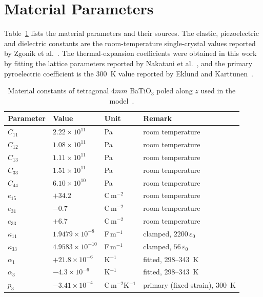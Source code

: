 \documentclass[a4paper,12pt]{elsarticle}
\begin{document}
\section{Material Parameters}
\label{sec:materials}

Table~\ref{tab:materials} lists the material parameters and their sources. The elastic,
piezoelectric and dielectric constants are the room-temperature single-crystal values
reported by Zgonik et al.~\cite{Zgonik1994}. The thermal-expansion coefficients were
obtained in this work by fitting the lattice parameters reported by Nakatani et al.~\cite{Nakatani2016}, and the primary pyroelectric coefficient is the 300~K value
reported by Eklund and Karttunen~\cite{EklundKarttunen2023}.

\begin{table}[t]
\centering
\small
\caption{Material constants of tetragonal $4mm$ BaTiO$_3$ poled along $z$ used in
the model~\cite{Zgonik1994,Nakatani2016,EklundKarttunen2023}.}
\label{tab:materials}
\begin{tabular}{@{}llll@{}}
\toprule
Parameter & Value & Unit & Remark \\
\midrule
$C_{11}$ & $2.22\times10^{11}$ & Pa & room temperature \\
$C_{12}$ & $1.08\times10^{11}$ & Pa & room temperature \\
$C_{13}$ & $1.11\times10^{11}$ & Pa & room temperature \\
$C_{33}$ & $1.51\times10^{11}$ & Pa & room temperature \\
$C_{44}$ & $6.10\times10^{10}$ & Pa & room temperature \\
$e_{15}$ & $+34.2$ & C\,m$^{-2}$ & room temperature \\
$e_{31}$ & $-0.7$ & C\,m$^{-2}$ & room temperature \\
$e_{33}$ & $+6.7$ & C\,m$^{-2}$ & room temperature \\
$\kappa_{11}$ & $1.9479\times10^{-8}$ & F\,m$^{-1}$ & clamped, $2200\,\varepsilon_0$ \\
$\kappa_{33}$ & $4.9583\times10^{-10}$ & F\,m$^{-1}$ & clamped, $56\,\varepsilon_0$ \\
$\alpha_1$ & $+21.8\times10^{-6}$ & K$^{-1}$ & fitted, 298--343~K \\
$\alpha_3$ & $-4.3\times10^{-6}$ & K$^{-1}$ & fitted, 298--343~K \\
$p_3$ & $-3.41\times10^{-4}$ & C\,m$^{-2}$K$^{-1}$ & primary (fixed strain), 300~K \\
\bottomrule
\end{tabular}
\end{table}
\end{document}
